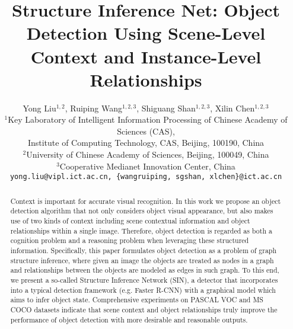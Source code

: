 \documentclass[10pt,twocolumn,letterpaper]{article}
\begin{document}
\title{Structure Inference Net: Object Detection Using Scene-Level Context and Instance-Level Relationships}

\author{Yong Liu$^{1,2}$, Ruiping Wang$^{1,2,3}$, Shiguang Shan$^{1,2,3}$, Xilin Chen$^{1,2,3}$\\
$^1$Key Laboratory of Intelligent Information Processing of Chinese Academy of Sciences (CAS),\\
Institute of Computing Technology, CAS, Beijing, 100190, China\\
$^2$University of Chinese Academy of Sciences, Beijing, 100049, China\\
$^3$Cooperative Medianet Innovation Center, China\\
{\tt\small yong.liu@vipl.ict.ac.cn, \{wangruiping, sgshan, xlchen\}@ict.ac.cn}}

\maketitle
\thispagestyle{empty}

\begin{abstract}
Context is important for accurate visual recognition. In this work we propose an object detection algorithm that not only considers object visual appearance, but also makes use of two kinds of context including scene contextual information and object relationships within a single image. Therefore, object detection is regarded as both a cognition problem and a reasoning problem when leveraging these structured information. Specifically, this paper formulates object detection as a problem of graph structure inference, where given an image the objects are treated as nodes in a graph and relationships between the objects are modeled as edges in such graph. To this end, we present a so-called Structure Inference Network (SIN), a detector that incorporates into a typical detection framework (e.g. Faster R-CNN) with a graphical model which aims to infer object state. Comprehensive experiments on PASCAL VOC and MS COCO datasets indicate that scene context and object relationships truly improve the performance of object detection with more desirable and reasonable outputs.
\end{abstract}
\end{document}
